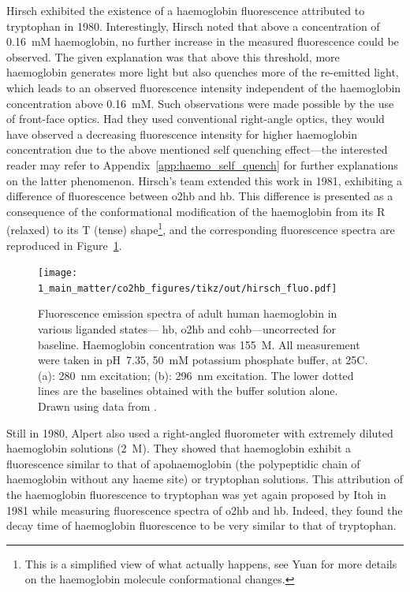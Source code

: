 Hirsch \etal{} exhibited the existence of a haemoglobin fluorescence attributed to tryptophan in 1980\cite{hirsch1980}. Interestingly, Hirsch noted that above a concentration of 0.16~mM haemoglobin, no further increase in the measured fluorescence could be observed. The given explanation was that above this threshold, more haemoglobin generates more light but also quenches more of the re-emitted light, which leads to an observed fluorescence intensity independent of the haemoglobin concentration above 0.16~mM. Such observations were made possible by the use of front-face optics. Had they used conventional right-angle optics, they would have observed a decreasing fluorescence intensity for higher haemoglobin concentration due to the above mentioned self quenching effect---the interested reader may refer to Appendix~\ref{app:haemo_self_quench} for further explanations on the latter phenomenon. Hirsch's team extended this work in 1981\cite{hirsch1981}, exhibiting a difference of fluorescence between \gls{o2hb} and \gls{hb}. This difference is presented as a consequence of the conformational modification of the haemoglobin from its R (relaxed) to its T (tense) shape\footnote{This is a simplified view of what actually happens, see Yuan \etal{} for more details on the haemoglobin molecule conformational changes\cite{yuan2015}.}, and the corresponding fluorescence spectra are reproduced in Figure~\ref{fig:co2hb:hirsch1981_fluo}.

\begin{figure}
	\centering
	\texttt{[image: 1\_main\_matter/co2hb\_figures/tikz/out/hirsch\_fluo.pdf]}
	\caption[Fluorescence emission spectra of adult human haemoglobin in various liganded states.]{Fluorescence emission spectra of adult human haemoglobin in various liganded states---\ie{} \gls{hb}, \gls{o2hb} and \gls{cohb}---uncorrected for baseline. Haemoglobin concentration was 155~\textmu{}M. All measurement were taken in pH~7.35, 50~mM potassium phosphate buffer, at 25{\degree}C. (a): 280~nm excitation; (b): 296~nm excitation. The lower dotted lines are the baselines obtained with the buffer solution alone. Drawn using data from \cite{hirsch1981}.}
	\label{fig:co2hb:hirsch1981_fluo}
\end{figure}

Still in 1980, Alpert \etal{} also used a right-angled fluorometer with extremely diluted haemoglobin solutions (2~\textmu{}M)\cite{alpert1980}. They showed that haemoglobin exhibit a fluorescence similar to that of apohaemoglobin (the polypeptidic chain of haemoglobin without any haeme site) or tryptophan solutions. This attribution of the haemoglobin fluorescence to tryptophan was yet again proposed by Itoh \etal{} in 1981\cite{itoh1981} while measuring fluorescence spectra of \gls{o2hb} and \gls{hb}. Indeed, they found the decay time of haemoglobin fluorescence to be very similar to that of tryptophan.

